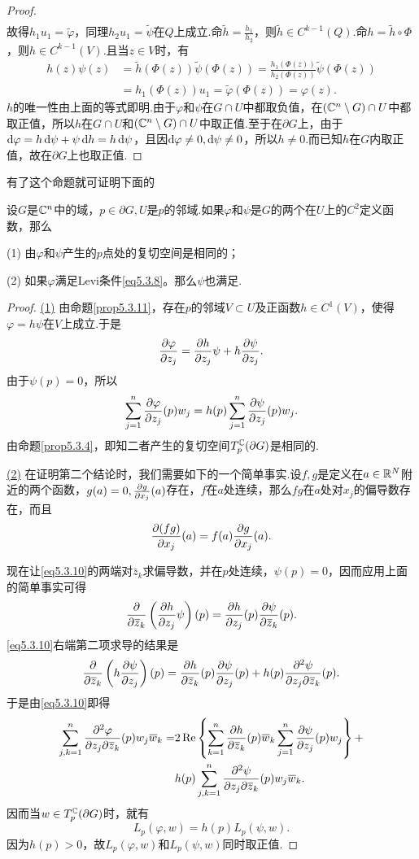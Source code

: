 \begin{proof}
\begin{align*}
	\end{align*}
故得$h_1u_1=\widetilde{\varphi}$，同理$h_2u_1=\widetilde{\psi}$在$Q$上成立.命$\widetilde{h}=\frac{h_1}{h_2}$，则$\widetilde{h}\in C^{k-1}(Q)$.命$h=\widetilde{h}\circ\Phi$，则$h\in C^{k-1}(V)$.且当$z\in V$时，有
\begin{align*}
	h(z)\psi(z)
	&=\widetilde{h}(\Phi(z))\widetilde{\psi}(\Phi(z))=\frac{h_1(\Phi(z))}{h_2(\Phi(z))}\widetilde{\psi}(\Phi(z))\\
	&=h_1(\Phi(z))u_1=\widetilde{\varphi}(\Phi(z))=\varphi(z).
\end{align*}
$h$的唯一性由上面的等式即明.由于$\varphi$和$\psi$在$G\cap U$中都取负值，在$(\mathbb C^n\setminus G)\cap U$中都取正值，所以$h$在$G\cap U$和$(\mathbb C^n\setminus G)\cap U$中取正值.至于在$\partial G$上，由于$\mathop{}\!\mathrm{d}\varphi=h\mathop{}\!\mathrm{d}\psi+\psi\mathop{}\!\mathrm{d} h=h\mathop{}\!\mathrm{d}\psi$，且因$\mathop{}\!\mathrm{d}\varphi\neq0,\mathop{}\!\mathrm{d}\psi\neq0$，所以$h\neq0$.而已知$h$在$G$内取正值，故在$\partial G$上也取正值.
\end{proof}
有了这个命题就可证明下面的
\begin{prop}\label{prop5.3.12}
	设$G$是$\mathbb C^n$中的域，$p\in\partial G,U$是$p$的邻域.如果$\varphi$和$\psi$是$G$的两个在$U$上的$C^2$定义函数，那么
	
	(1)\hypertarget{5.3.12}{}
	由$\varphi$和$\psi$产生的$p$点处的复切空间是相同的；
	
	(2)\hypertarget{5.3.12}{}
	如果$\varphi$满足Levi条件\eqref{eq5.3.8}。那么$\psi$也满足.
\end{prop}
\begin{proof}
	\hyperlink{5.3.12}{(1)}
	由命题\ref{prop5.3.11}，存在$p$的邻域$V\subset U$及正函数$h\in C^1(V)$，使得$\varphi=h\psi$在$V$上成立.于是
	\begin{equation}\label{eq5.3.10}
		\frac{\partial \varphi}{\partial z_j}=\frac{\partial h}{\partial z_j}\psi+h\frac{\partial \psi}{\partial z_j}.
	\end{equation}
由于$\psi(p)=0$，所以
\[\sum_{j=1}^{n}\frac{\partial \varphi}{\partial z_j}(p)w_j=h(p)\sum_{j=1}^{n}\frac{\partial \psi}{\partial z_j}(p)w_j.\]
由命题\ref{prop5.3.4}，即知二者产生的复切空间$T_p^\mathbb C(\partial G)$是相同的.
	
	\hyperlink{5.3.12}{(2)}
	在证明第二个结论时，我们需要如下的一个简单事实.设$f,g$是定义在$a\in\mathbb R^N$附近的两个函数，$g(a)=0,\frac{\partial g}{\partial x_j}(a)$存在，$f$在$a$处连续，那么$fg$在$a$处对$x_j$的偏导数存在，而且
	\[\frac{\partial (fg)}{\partial x_j}(a)=f(a)\frac{\partial g}{\partial x_j}(a).\]
	
	现在让\eqref{eq5.3.10}的两端对$\bar{z}_k$求偏导数，并在$p$处连续，$\psi(p)=0$，因而应用上面的简单事实可得
	\[\frac{\partial }{\partial {}\mkern1mu\overline{\mkern-1muz}_k}\left(\frac{\partial h}{\partial z_j}\psi\right)(p)=\frac{\partial h}{\partial z_j}(p)\frac{\partial \psi}{\partial {}\mkern1mu\overline{\mkern-1muz}_k}(p).\]
	\eqref{eq5.3.10}右端第二项求导的结果是
	\[\frac{\partial }{\partial {}\mkern1mu\overline{\mkern-1muz}_k}\left(h\frac{\partial \psi}{\partial z_j}\right)(p)=\frac{\partial h}{\partial {}\mkern1mu\overline{\mkern-1muz}_k}(p)\frac{\partial \psi}{\partial z_j}(p)+h(p)\frac{\partial^2 \psi}{\partial z_j\partial {}\mkern1mu\overline{\mkern-1muz}_k}(p).\]
	于是由\eqref{eq5.3.10}即得
	\begin{align*}
		\sum_{j,k=1}^{n}\frac{\partial^2 \varphi}{\partial z_j\partial {}\mkern1mu\overline{\mkern-1muz}_k}(p)w_j{}\mkern1mu\overline{\mkern-1muw}_k
		=&2\operatorname{Re}\left\{\sum_{k=1}^{n}\frac{\partial h}{\partial {}\mkern1mu\overline{\mkern-1muz}_k}(p){}\mkern1mu\overline{\mkern-1muw}_k\sum_{j=1}^{n}\frac{\partial \psi}{\partial z_j}(p)w_j\right\}+\\
		&h(p)\sum_{j,k=1}^{n}\frac{\partial^2 \psi}{\partial z_j\partial {}\mkern1mu\overline{\mkern-1muz}_k}(p)w_j{}\mkern1mu\overline{\mkern-1muw}_k.
	\end{align*}
因而当$w\in T_p^\mathbb C(\partial G)$时，就有
\[L_p(\varphi,w)=h(p)L_p(\psi,w).\]
因为$h(p)>0$，故$L_p(\varphi,w)$和$L_p(\psi,w)$同时取正值.
\end{proof}
